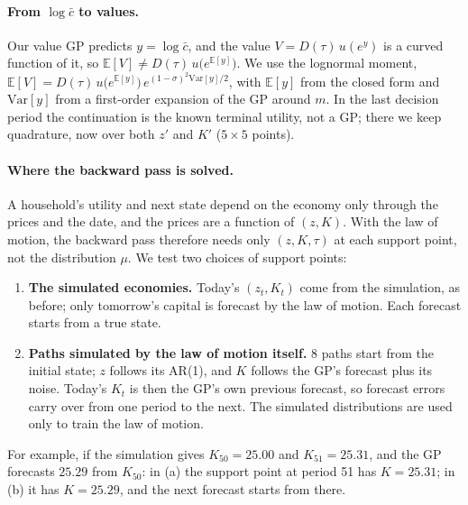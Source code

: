 \documentclass[11pt,a4paper]{article}
\begin{document}
\paragraph{From $\log \bar c$ to values.} Our value GP predicts $y = \log \bar c$, and the value
$V = D(\tau)\,u(e^{y})$ is a curved function of it, so $\mathbb E[V] \neq D(\tau)\,u\big(e^{\mathbb E[y]}\big)$.
We use the lognormal moment,
$\mathbb E[V] = D(\tau)\, u\big(e^{\mathbb E[y]}\big)\, e^{(1-\sigma)^2 \mathrm{Var}[y]/2}$, with
$\mathbb E[y]$ from the closed form and $\mathrm{Var}[y]$ from a first-order expansion of the GP
around $m$. In the last decision period the continuation is the known terminal utility, not a GP;
there we keep quadrature, now over both $z'$ and $K'$ ($5 \times 5$ points).

\paragraph{Where the backward pass is solved.} A household's utility and next state depend on the
economy only through the prices and the date, and the prices are a function of $(z, K)$. With the law
of motion, the backward pass therefore needs only $(z, K, \tau)$ at each support point, not the
distribution $\mu$. We test two choices of support points:
\begin{enumerate}[label=(\alph*)]
\item \textbf{The simulated economies.} Today's $(z_t, K_t)$ come from the simulation, as before;
  only tomorrow's capital is forecast by the law of motion. Each forecast starts from a true state.
\item \textbf{Paths simulated by the law of motion itself.} 8 paths start from the initial state;
  $z$ follows its AR(1), and $K$ follows the GP's forecast plus its noise. Today's $K_t$ is then the
  GP's own previous forecast, so forecast errors carry over from one period to the next. The
  simulated distributions are used only to train the law of motion.
\end{enumerate}
For example, if the simulation gives $K_{50} = 25.00$ and $K_{51} = 25.31$, and the GP forecasts
$25.29$ from $K_{50}$: in (a) the support point at period 51 has $K = 25.31$; in (b) it has
$K = 25.29$, and the next forecast starts from there.
\end{document}

